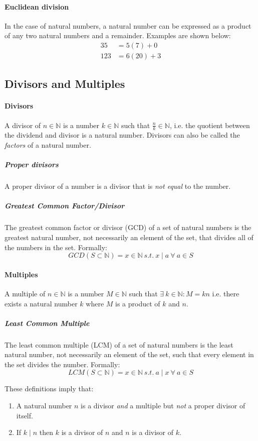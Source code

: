 \paragraph{Euclidean division}
In the case of natural numbers, a natural number can be expressed as a product of any two natural numbers and a remainder.
Examples are shown below:
\begin{align*}
    35 &= 5(7) + 0 \\
    123 &= 6(20) + 3
\end{align*}

\subsection{Divisors and Multiples}
\paragraph{Divisors}
A divisor of $n \in \mathbb{N}$ is a number $k \in \mathbb{N}$ such that $\frac{n}{k} \in \mathbb{N}$, i.e. the quotient between the dividend and divisor is a natural number.
Divisors can also be called the \emph{factors} of a natural number.

\subparagraph{Proper divisors}
A proper divisor of a number is a divisor that is \emph{not equal} to the number.

\subparagraph{Greatest Common Factor/Divisor}
The greatest common factor or divisor (GCD) of a set of natural numbers is the greatest natural number, not necessarily an element of the set, that divides all of the numbers in the set.
Formally:
\[
GCD(S \subset \mathbb{N}) = x \in \mathbb{N}\ s.t.\ x \mid a\ \forall\ a \in S
\]

\paragraph{Multiples}
A multiple of $n \in \mathbb{N}$ is a number $M \in \mathbb{N}$ such that $\exists\ k \in \mathbb{N} : M = kn$ i.e. there exists a natural number $k$ where $M$ is a product of $k$ and $n$.

\subparagraph{Least Common Multiple}
The least common multiple (LCM) of a set of natural numbers is the least natural number, not necessarily an element of the set, such that every element in the set divides the number.
Formally:
\[
LCM(S \subset \mathbb{N}) = x \in \mathbb{N}\ s.t.\ a \mid x\ \forall\ a \in S
\]

These definitions imply that:
\begin{enumerate}
    \item A natural number $n$ is a divisor \emph{and} a multiple but \emph{not} a proper divisor of itself.
    \item If $k \mid n$ then $k$ is a divisor of $n$ and $n$ is a divisor of $k$.
\end{enumerate}

